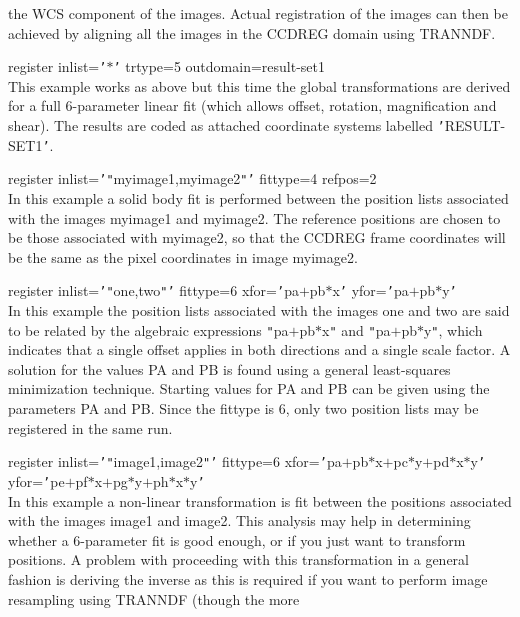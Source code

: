 \documentclass[twoside,11pt]{article}
\newcommand{\htmlref}[2]{#1}
\renewcommand{\_}{\texttt{\symbol{95}}}
\newcommand{\qt}[1]{{\tt "}#1{\tt "}}
\newcommand{\qs}[1]{{\tt '}#1{\tt '}}
\newcommand{\xroutine}[1]{\htmlref{{\sc #1}}{#1}}
\newcommand{\sstexamplesubsection}[2]{\sloppy \item{\ssttt #1} \mbox{} \\ #2 }
\newcommand{\sstexamplesubsection}[2]{\item[{\ssttt #1}] #2}
\begin{document}
{{{         the WCS component of the images.  Actual registration of the
         images  can then be achieved by aligning all the images in the
         CCD\_REG domain using \xroutine{TRANNDF}.
      }
      \sstexamplesubsection{
         register inlist=\qs{$*$} trtype=5 outdomain=result-set1
      } {
         This example works as above but this time the global
         transformations are derived for a full 6-parameter linear fit
         (which allows offset, rotation, magnification and shear).
         The results are coded as attached coordinate systems labelled
         {\tt '}RESULT-SET1{\tt '}.
      }
      \sstexamplesubsection{
         register inlist=\qs{\qt{myimage1,myimage2}} fittype=4 refpos=2
      } {
         In this example a solid body fit is performed between the
         position lists associated with the images myimage1 and myimage2.
         The reference positions are chosen to be those associated with
         myimage2, so that the CCD\_REG frame coordinates will be the
         same as the pixel coordinates in image myimage2.
      }
      \sstexamplesubsection{
         register inlist={\tt '}{\tt "}one,two{\tt "}{\tt '} fittype=6 xfor={\tt '}pa$+$pb$*$x{\tt '} yfor={\tt '}pa$+$pb$*$y{\tt '}
      }{ 
         In this example the position lists associated with the images
         one and two are said to be related by the algebraic
         expressions {\tt "}pa$+$pb$*$x{\tt "} and {\tt "}pa$+$pb$*$y{\tt "}, which indicates that a
         single offset applies in both directions and a single scale
         factor. A solution for the values PA and PB is found using a
         general least-squares minimization technique. Starting values
         for PA and PB can be given using the parameters PA and PB.
         Since the fittype is 6, only two position lists may be
         registered in the same run.
      }
      \sstexamplesubsection{
         register inlist={\tt '}{\tt "}image1,image2{\tt "}{\tt '} fittype=6 xfor={\tt '}pa$+$pb$*$x$+$pc$*$y$+$pd$*$x$*$y{\tt '}
               yfor={\tt '}pe$+$pf$*$x$+$pg$*$y$+$ph$*$x$*$y{\tt '}
      }{
         In this example a non-linear transformation is fit between the
         positions associated with the images image1 and image2. This analysis
         may help in determining whether a 6-parameter fit is good
         enough, or if you just want to transform positions. A problem
         with proceeding with this transformation in a general fashion
         is deriving the inverse as this is required if you want to
         perform image resampling using TRANNDF (though the more
}}}
\end{document}

